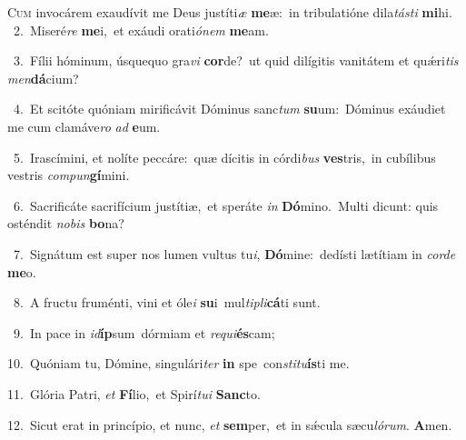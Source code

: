 \lettrine{\initial\textcolor{\initialcolor}{C}}{um} invocárem exaudívit me Deus justíti\textit{æ} \textbf{me}\-æ:~\star in tribulatióne dila\-\textit{tás}\-\textit{ti} \textbf{mi}\-hi.\\
{\numbfont\textcolor{\numbcolor}{~2.}}~Miseré\textit{re} \textbf{me}\-i,~\star et exáudi orati\-\textit{ó}\-\textit{nem} \textbf{me}\-am.\par
{\numbfont\textcolor{\numbcolor}{~3.}}~Fílii hóminum, úsquequo gra\textit{vi} \textbf{cor}\-de?~\star ut quid dilígitis vanitátem et quǽri\textit{tis} \textit{men}\-\textbf{dá}cium?\par
{\numbfont\textcolor{\numbcolor}{~4.}}~Et scitóte quóniam mirificávit Dóminus sanc\textit{tum} \textbf{su}\-um:~\star Dóminus exáudiet me cum clamáve\textit{ro} \textit{ad} \textbf{e}\-um.\par
{\numbfont\textcolor{\numbcolor}{~5.}}~Irascímini, et nolíte peccáre:~\dagger quæ dícitis in córdi\textit{bus} \textbf{ves}\-tris,~\star in cubílibus vestris \textit{com}\-\textit{pun}\textbf{gí}mini.\par
{\numbfont\textcolor{\numbcolor}{~6.}}~Sacrificáte sacrifícium justítiæ,~\dagger et speráte \textit{in} \textbf{Dó}\-mino.~\star Multi dicunt: quis osténdit \textit{no}\-\textit{bis} \textbf{bo}\-na?\par
{\numbfont\textcolor{\numbcolor}{~7.}}~Signátum est super nos lumen vultus tu\-\textit{i}\-, \textbf{Dó}\-mine:~\star dedísti lætítiam in \textit{cor}\-\textit{de} \textbf{me}\-o.\par
{\numbfont\textcolor{\numbcolor}{~8.}}~A fructu fruménti, vini et óle\textit{i} \textbf{su}\-i~\star mul\-\textit{ti}\-\textit{pli}\textbf{cá}ti sunt.\par
{\numbfont\textcolor{\numbcolor}{~9.}}~In pace in \textit{id}\-\textbf{íp}sum~\star dórmiam et \textit{re}\-\textit{qui}\textbf{és}cam;\par
{\numbfont\textcolor{\numbcolor}{10.}}~Quóniam tu, Dómine, singulári\textit{ter} \textbf{in} spe~\star con\-\textit{sti}\-\textit{tu}\textbf{ís}ti me.\par
{\numbfont\textcolor{\numbcolor}{11.}}~Glória Patri, \textit{et} \textbf{Fí}\-lio,~\star et Spirí\-\textit{tu}\-\textit{i} \textbf{Sanc}\-to.\par
{\numbfont\textcolor{\numbcolor}{12.}}~Sicut erat in princípio, et nunc, \textit{et} \textbf{sem}\-per,~\star et in sǽcula sæcu\-\textit{ló}\-\textit{rum}. \textbf{A}\-men.\par
